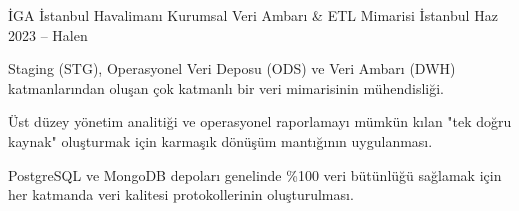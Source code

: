 \begin{cventries}
  \cventry
    {İGA İstanbul Havalimanı}
    {Kurumsal Veri Ambarı \& ETL Mimarisi}
    {İstanbul}
    {Haz 2023 – Halen}
    {
      \begin{cvitems}
        \item {Staging (STG), Operasyonel Veri Deposu (ODS) ve Veri Ambarı (DWH) katmanlarından oluşan çok katmanlı bir veri mimarisinin mühendisliği.}
        \item {Üst düzey yönetim analitiği ve operasyonel raporlamayı mümkün kılan "tek doğru kaynak" oluşturmak için karmaşık dönüşüm mantığının uygulanması.}
        \item {PostgreSQL ve MongoDB depoları genelinde \%100 veri bütünlüğü sağlamak için her katmanda veri kalitesi protokollerinin oluşturulması.}
      \end{cvitems}
    }

\end{cventries}
